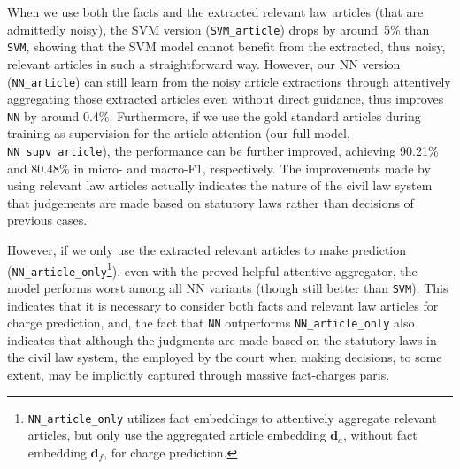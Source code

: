 
When we use both the facts and the extracted relevant law articles (that are admittedly noisy),
the SVM version (\texttt{SVM\_article}) drops by around~5\% than \texttt{SVM}, showing that the SVM model 
cannot benefit from the extracted, thus noisy, relevant articles in such a straightforward way.
However, our NN version (\texttt{NN\_article}) can still learn from  the noisy article extractions through 
attentively aggregating those extracted articles even without direct guidance,
thus improves \texttt{NN} by around 0.4\%.
Furthermore, if we use the gold standard articles during training as supervision for the 
article attention (our full model, \texttt{NN\_supv\_article}), the performance can be further improved, achieving 
90.21\% and 80.48\% in micro- and macro-F1, respectively.
The improvements made by using relevant law articles actually indicates the nature of the civil law system that judgements are made based on statutory laws rather than decisions of previous cases.

However, if we only use the extracted relevant articles to make prediction (\texttt{NN\_article\_only}\footnote{
\texttt{NN\_article\_only} utilizes fact embeddings to attentively aggregate relevant articles, but only use 
the aggregated article embedding $\mathbf{d}_a$, without fact embedding  $\mathbf{d}_f$,  for charge prediction.}),
even with the proved-helpful attentive aggregator, the model performs worst among all NN 
variants (though still better than \texttt{SVM}). This indicates that  it is necessary to consider both facts and 
relevant law articles for charge prediction, and,
the fact that \texttt{NN} outperforms \texttt{NN\_article\_only} also indicates that although the judgments are made based on the statutory laws in the civil law system,
the  %
employed by the court when making decisions,
to some extent, may be implicitly captured through massive fact-charges paris.



